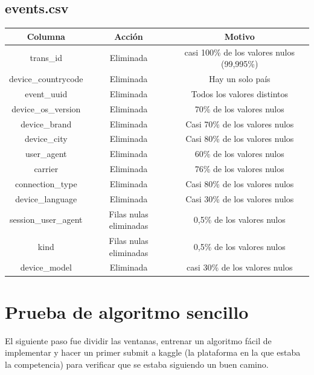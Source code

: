 \documentclass{article}
\begin{document}
\subsection{events.csv}
\FloatBarrier
\begin{center}
        \begin{tabular}{ |c|c|c| }
          \hline
          Columna & Acción & Motivo \\
          \hline\hline
          trans\_id & Eliminada & casi 100\% de los valores nulos (99,995\%) \\
          \hline
          device\_countrycode & Eliminada & Hay un solo país \\
          \hline
          event\_uuid & Eliminada & Todos los valores distintos \\
          \hline
          device\_os\_version & Eliminada & 70\% de los valores nulos \\
          \hline
          device\_brand & Eliminada & Casi 70\% de los valores nulos \\
          \hline
          device\_city & Eliminada & Casi 80\% de los valores nulos \\
          \hline
          user\_agent & Eliminada & 60\% de los valores nulos \\
          \hline
          carrier & Eliminada & 76\% de los valores nulos \\
          \hline
          connection\_type & Eliminada & Casi 80\% de los valores nulos \\
          \hline
          device\_language & Eliminada & Casi 30\% de los valores nulos \\
          \hline
          session_user_agent & Filas nulas eliminadas & 0,5\% de los valores nulos \\
          \hline
          kind & Filas nulas eliminadas & 0,5\% de los valores nulos \\
          \hline
          device\_model & Eliminada & casi 30\% de los valores nulos \\
          \hline
        \end{tabular}
\end{center}
\FloatBarrier

\newpage
\section{Prueba de algoritmo sencillo}
El siguiente paso fue dividir las ventanas, entrenar un algoritmo fácil de implementar y hacer un primer submit a kaggle (la plataforma en la que estaba la competencia) para verificar que se estaba siguiendo un buen camino.
\end{document}
